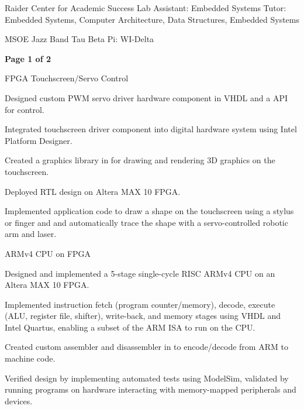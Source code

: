 \documentclass[11pt]{article}
\begin{document}

\sectiontutor
{Raider Center for Academic Success}
{Lab Assistant: Embedded Systems}{}
{Tutor: Embedded Systems, Computer Architecture, Data Structures, Embedded Systems}{}

\vspace{-1.6ex}
\sectionsingle
{MSOE Jazz Band}{}
\vspace{-1.4ex}
\sectionsingle
{Tau Beta Pi: WI-Delta}{}
\vspace{0.5ex}

\vfill
\hfill {\bfseries{Page 1 of 2}}



\sectionproj
{FPGA Touchscreen/Servo Control} 
{\begin{circlist}
	\item Designed custom PWM servo driver hardware component in VHDL and a  API for control.
	\item Integrated touchscreen driver component into digital hardware system using Intel Platform Designer.
	\item Created a graphics library in  for drawing and rendering 3D graphics on the touchscreen.
	\item Deployed RTL design on Altera MAX 10 FPGA. 
	\item Implemented application code to draw a shape on the touchscreen using a stylus or finger and and automatically trace the shape with a servo-controlled robotic arm and laser. 
\end{circlist}}

\sectionproj
{ARMv4 CPU on FPGA} 
{\begin{circlist}
	\item Designed and implemented a 5-stage single-cycle RISC ARMv4 CPU on an Altera MAX 10 FPGA. 
	\item Implemented instruction fetch (program counter/memory), decode, execute (ALU, register file, shifter), write-back, and memory stages using VHDL and Intel Quartus, enabling a subset of the ARM ISA to run on the CPU.
	\item Created custom assembler and disassembler in  to encode/decode from ARM to machine code.
	\item Verified design by implementing automated tests using ModelSim, validated by running programs on hardware interacting with memory-mapped peripherals and devices.
\end{circlist}}
\end{document}
